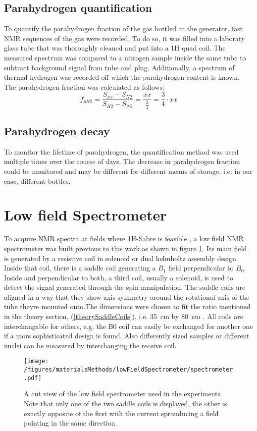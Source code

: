         \subsection{Parahydrogen quantification}
            To quantify the parahydrogen fraction of the gas bottled at the generator, fast NMR sequences of the gas were recorded. To do so, it was filled into a laboraty glass tube that was thoroughly cleaned and put into a 1H quad coil. The measured spectrum was compared to a nitrogen sample inside the same tube to subtract background signal from tube and plug. Additionally, a spectrum of thermal hydrogen was recorded off which the parahydrogen content is known. The parahydrogen fraction was calculated as follows: 
            \begin{equation}
                f_{pH2} = \frac{S_{xx}-S_{N2}}{S_{H2}-S_{N2}} = \frac{xx}{\tfrac{3}{4}} = \frac{3}{4} \cdot xx
            \end{equation}
        \subsection{Parahydrogen decay}
            To monitor the lifetime of parahydrogen, the quantification method was used multiple times over the course of days. The decrease in parahydrogen fraction could be monitored and may be different for different means of storage, i.e. in our case, different bottles.
        \section{Low field Spectrometer}
        To acquire NMR spectra at fields where 1H-Sabre is feasible , a low field NMR spectrometer was built  previous to this work as shown in figure \ref{figure:materialsMethods:lowFieldSpec}. Its main field is generated by a resisitve coil in solenoid or dual helmholtz assembly design. Inside that coil, there is a saddle coil generating a $B_1$ field perpendicular to $B_0$. Inside and perpendicular to both, a third coil, usually a solenoid, is used to detect the signal generated through the spin manipulation. The saddle coils are aligned in a way that they show axis symmetry around the rotational axis of the tube theyre mounted onto.The dimensions were chosen to fit the ratio mentioned in the theory section, (\ref{theorySaddleCoils}), i.e. \SI{35}{\cm} by \SI{80}{\cm} . All coils are interchangable for others, e.g. the B0 coil can easily be exchanged for another one if a mors sophisticated design is found. Also differently sized samples or different nuclei can be measured by interchanging the receive coil.
        \begin{figure}
            \texttt{[image: /figures/materialsMethods/lowFieldSpectrometer/spectrometer.pdf]}
            \caption[Schematic view low field spectrometer]{A cut view of the low field spectrometer used in the experiments. Note that only one of the two saddle coils is displayed, the other is exactly opposite of the first with the current sprouducing a field pointing in the same direction.}
            \label{figure:materialsMethods:lowFieldSpec}
        \end{figure}
